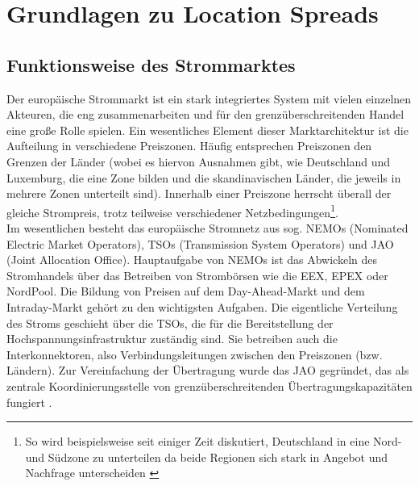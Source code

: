 \section{Grundlagen zu Location Spreads}
\label{sec:Grundlagen zu Location Spreads}

\subsection{Funktionsweise des Strommarktes}
\label{sec:Funktionsweise des Strommarktes}
Der europäische Strommarkt ist ein stark integriertes System mit vielen einzelnen Akteuren, die eng zusammenarbeiten und für den grenzüberschreitenden Handel eine große Rolle spielen. Ein wesentliches Element dieser Marktarchitektur ist die Aufteilung in verschiedene Preiszonen. Häufig entsprechen Preiszonen den Grenzen der Länder (wobei es hiervon Ausnahmen gibt, wie Deutschland und Luxemburg, die eine Zone bilden und die skandinavischen Länder, die jeweils in mehrere Zonen unterteilt sind). Innerhalb einer Preiszone herrscht überall der gleiche Strompreis, trotz teilweise verschiedener Netzbedingungen\footnote{So wird beispielsweise seit einiger Zeit diskutiert, Deutschland in eine Nord- und Südzone zu unterteilen da beide Regionen sich stark in Angebot und Nachfrage unterscheiden \cite{17}}.\\
Im wesentlichen besteht das europäische Stromnetz aus sog. NEMOs (Nominated Electric Market Operators), TSOs (Transmission System Operators) und JAO (Joint Allocation Office). Hauptaufgabe von NEMOs ist das Abwickeln des Stromhandels über das Betreiben von Strombörsen wie die EEX, EPEX oder NordPool. Die Bildung von Preisen auf dem Day-Ahead-Markt und dem Intraday-Markt gehört zu den wichtigsten Aufgaben. Die eigentliche Verteilung des Stroms geschieht über die TSOs, die für die Bereitstellung der Hochspannungsinfrastruktur zuständig sind. Sie betreiben auch die Interkonnektoren, also Verbindungsleitungen zwischen den Preiszonen (bzw. Ländern). Zur Vereinfachung der Übertragung wurde das JAO gegründet, das als zentrale Koordinierungsstelle von grenzüberschreitenden Übertragungskapazitäten fungiert \cite{23}. \\
